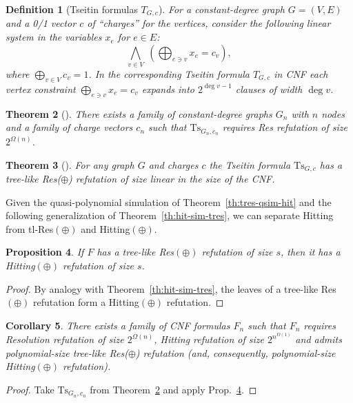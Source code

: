 \documentclass[11pt]{article}
\newcommand{\scterm}[1]{{\textrm{\sc #1}}}
\newcommand{\hit}{\scterm{Hitting}}
\newcommand{\tres}{\scterm{tl-Res}}
\newcommand{\res}{\scterm{Res}}
\newcommand{\resp}{{\res}$(\oplus)$}
\newcommand{\tresp}{{\tres}$(\oplus)$}
\newcommand{\hitp}{{\hit}$(\oplus)$}
\numberwithin{equation}{section}
\newtheorem{theorem}{Theorem}[section]
\newtheorem{proposition}[theorem]{Proposition}
\newtheorem{corollary}[theorem]{Corollary}
\newtheorem{definition}[theorem]{Definition}
\begin{document}
\begin{definition}[Tseitin formulas $T_{G,c}$]\label{def:tseitin}
For a constant-degree graph $G=(V,E)$ and a 0/1 vector $c$ of ``charges'' for the vertices, 
consider the following linear system in the variables $x_{e}$ for $e\in E$:
\[
\bigwedge_{v\in V}\; 
\left(
\bigoplus_{e\ni v} 
x_{e}=c_v 
\right),
\]
where $\bigoplus_{v\in V} c_v=1$.
In the corresponding Tseitin formula $T_{G,c}$ in CNF
each vertex constraint $\bigoplus_{e\ni v}x_e=c_v$
expands into $2^{\deg v - 1}$ clauses of width $\deg v$.
\end{definition}

\begin{theorem}[\cite{Urq87}]
\label{th:res-lowerbound-tseitin}
    There exists a family of constant-degree graphs $G_n$ with $n$ nodes and a family of charge vectors $c_n$ such that $\mathrm{Ts}_{G_n,c_n}$ requires {\res} refutation of size $2^{\Omega(n)}$.
\end{theorem}

\begin{theorem}[\cite{IS20}]
    For any graph $G$ and charges $c$ the Tseitin formula $\mathrm{Ts}_{G,c}$ has a tree-like Res($\oplus$) refutation of size linear in the size of the CNF.
\end{theorem}

Given the quasi-polynomial simulation of Theorem~\ref{th:tres-qsim-hit}
and the following generalization of Theorem~\ref{th:hit-sim-tres}, 
we can separate {\hit} from {\tresp} and {\hitp}.

\begin{proposition}\label{prop:hitp-sim-tresp}
If $F$ has a tree-like {\resp} refutation of size $s$, 
then it has a {\hitp} refutation of size $s$.
\end{proposition}
\begin{proof}
By analogy with Theorem~\ref{th:hit-sim-tres}, 
the leaves of a tree-like {\resp} refutation form a {\hitp} refutation. 
\end{proof}

\begin{corollary}
\label{cor:tlresxor-vs-hitting}
  There exists a family of CNF formulas $F_n$ such that $F_n$ requires Resolution refutation of size $2^{\Omega(n)}$, Hitting refutation of size $2^{n^{\Omega(1)}}$ and admits polynomial-size tree-like Res($\oplus$) refutation (and, consequently, polynomial-size {\hitp} refutation).
\end{corollary}
\begin{proof}
  Take $\mathrm{Ts}_{G_n, c_n}$ from Theorem~\ref{th:res-lowerbound-tseitin} and apply Prop.~\ref{prop:hitp-sim-tresp}.
\end{proof}
\end{document}
